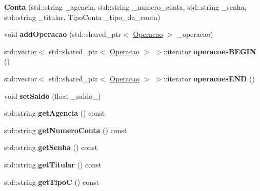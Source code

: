 \begin{DoxyCompactItemize}
\item 
\mbox{\label{classConta_a840bac7d94992024fc14e6c3f37ddf6f}} 
{\bfseries Conta} (std\+::string \+\_\+agencia, std\+::string \+\_\+numero\+\_\+conta, std\+::string \+\_\+senha, std\+::string \+\_\+titular, Tipo\+Conta \+\_\+tipo\+\_\+da\+\_\+conta)
\item 
\mbox{\label{classConta_a36b7092e235e0383387b76dd6d44123f}} 
void {\bfseries add\+Operacao} (std\+::shared\+\_\+ptr$<$ \hyperlink{classOperacao}{Operacao} $>$ \+\_\+operacao)
\item 
\mbox{\label{classConta_a3c15dc4739795232f3bb38bd4ac3f4d9}} 
std\+::vector$<$ std\+::shared\+\_\+ptr$<$ \hyperlink{classOperacao}{Operacao} $>$ $>$\+::iterator {\bfseries operacoes\+B\+E\+G\+IN} ()
\item 
\mbox{\label{classConta_a7383512795267f4cd4a2635595c99b12}} 
std\+::vector$<$ std\+::shared\+\_\+ptr$<$ \hyperlink{classOperacao}{Operacao} $>$ $>$\+::iterator {\bfseries operacoes\+E\+ND} ()
\item 
\mbox{\label{classConta_a8415b0c8b9571add46e97e31bb9c41a8}} 
void {\bfseries set\+Saldo} (float \+\_\+saldo\+\_\+)
\item 
\mbox{\label{classConta_a64ddf0f8d86ee74e3cf4e1c1c0d934c9}} 
std\+::string {\bfseries get\+Agencia} () const
\item 
\mbox{\label{classConta_a1ca2df26b51446e9083d01258abe926a}} 
std\+::string {\bfseries get\+Numero\+Conta} () const
\item 
\mbox{\label{classConta_aace6d48702efd2d146db2e97ba1efba1}} 
std\+::string {\bfseries get\+Senha} () const
\item 
\mbox{\label{classConta_a59b243246c7b36d84c5d02837df72796}} 
std\+::string {\bfseries get\+Titular} () const
\item 
\mbox{\label{classConta_a7d56060e2dcd67d39f87f1b2d51b0742}} 
std\+::string {\bfseries get\+TipoC} () const
\item 

\end{DoxyCompactItemize}
